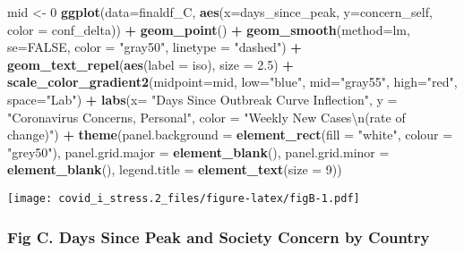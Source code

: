 \documentclass[
]{article}
\newenvironment{Shaded}{\begin{snugshade}}{\end{snugshade}}
\newcommand{\CharTok}[1]{\textcolor[rgb]{0.31,0.60,0.02}{#1}}
\newcommand{\DataTypeTok}[1]{\textcolor[rgb]{0.13,0.29,0.53}{#1}}
\newcommand{\DecValTok}[1]{\textcolor[rgb]{0.00,0.00,0.81}{#1}}
\newcommand{\FloatTok}[1]{\textcolor[rgb]{0.00,0.00,0.81}{#1}}
\newcommand{\KeywordTok}[1]{\textcolor[rgb]{0.13,0.29,0.53}{\textbf{#1}}}
\newcommand{\NormalTok}[1]{#1}
\newcommand{\OperatorTok}[1]{\textcolor[rgb]{0.81,0.36,0.00}{\textbf{#1}}}
\newcommand{\OtherTok}[1]{\textcolor[rgb]{0.56,0.35,0.01}{#1}}
\newcommand{\StringTok}[1]{\textcolor[rgb]{0.31,0.60,0.02}{#1}}
\begin{document}
\begin{Shaded}
\begin{Highlighting}[]
\NormalTok{mid <-}\StringTok{ }\DecValTok{0}
\KeywordTok{ggplot}\NormalTok{(}\DataTypeTok{data=}\NormalTok{finaldf_C, }\KeywordTok{aes}\NormalTok{(}\DataTypeTok{x=}\NormalTok{days_since_peak, }\DataTypeTok{y=}\NormalTok{concern_self, }\DataTypeTok{color =}\NormalTok{ conf_delta)) }\OperatorTok{+}
\StringTok{  }\KeywordTok{geom_point}\NormalTok{() }\OperatorTok{+}
\StringTok{  }\KeywordTok{geom_smooth}\NormalTok{(}\DataTypeTok{method=}\NormalTok{lm, }\DataTypeTok{se=}\OtherTok{FALSE}\NormalTok{, }\DataTypeTok{color =} \StringTok{"gray50"}\NormalTok{, }\DataTypeTok{linetype =} \StringTok{"dashed"}\NormalTok{) }\OperatorTok{+}
\StringTok{  }\KeywordTok{geom_text_repel}\NormalTok{(}\KeywordTok{aes}\NormalTok{(}\DataTypeTok{label =}\NormalTok{ iso), }\DataTypeTok{size =} \FloatTok{2.5}\NormalTok{) }\OperatorTok{+}
\StringTok{  }\KeywordTok{scale_color_gradient2}\NormalTok{(}\DataTypeTok{midpoint=}\NormalTok{mid, }\DataTypeTok{low=}\StringTok{"blue"}\NormalTok{, }\DataTypeTok{mid=}\StringTok{"gray55"}\NormalTok{, }\DataTypeTok{high=}\StringTok{"red"}\NormalTok{, }\DataTypeTok{space=}\StringTok{"Lab"}\NormalTok{) }\OperatorTok{+}
\StringTok{  }\KeywordTok{labs}\NormalTok{(}\DataTypeTok{x=} \StringTok{"Days Since Outbreak Curve Inflection"}\NormalTok{, }\DataTypeTok{y =} \StringTok{"Coronavirus Concerns, Personal"}\NormalTok{, }\DataTypeTok{color =} \StringTok{"Weekly New Cases}\CharTok{\textbackslash{}n}\StringTok{(rate of change)"}\NormalTok{) }\OperatorTok{+}
\StringTok{      }\KeywordTok{theme}\NormalTok{(}\DataTypeTok{panel.background =} \KeywordTok{element_rect}\NormalTok{(}\DataTypeTok{fill =} \StringTok{"white"}\NormalTok{, }\DataTypeTok{colour =} \StringTok{"grey50"}\NormalTok{),}
        \DataTypeTok{panel.grid.major =} \KeywordTok{element_blank}\NormalTok{(),}
        \DataTypeTok{panel.grid.minor =} \KeywordTok{element_blank}\NormalTok{(),}
        \DataTypeTok{legend.title =} \KeywordTok{element_text}\NormalTok{(}\DataTypeTok{size =} \DecValTok{9}\NormalTok{))}
\end{Highlighting}
\end{Shaded}

\texttt{[image: covid\_i\_stress.2\_files/figure-latex/figB-1.pdf]}

\hypertarget{fig-c.-days-since-peak-and-society-concern-by-country}{%
\subsubsection{Fig C. Days Since Peak and Society Concern by
Country}\label{fig-c.-days-since-peak-and-society-concern-by-country}}
\end{document}

